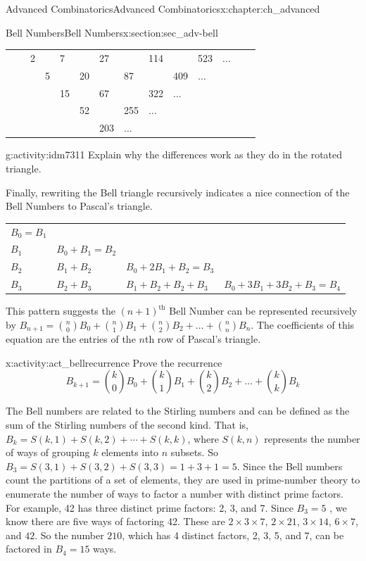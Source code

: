 \documentclass[oneside,10pt,]{book}
\numberwithin{equation}{chapter}
\begin{document}
\begin{chapterptx}{Advanced Combinatorics}{}{Advanced Combinatorics}{}{}{x:chapter:ch_advanced}
\begin{sectionptx}{Bell Numbers}{}{Bell Numbers}{}{}{x:section:sec_adv-bell}
\begin{sidebyside}{1}{0}{0}{0}
\begin{sbspanel}{1}
{\begin{tabular}{llllllllllllll}
&&2&&7&&27&&114&&523&\(\ldots\)&&\tabularnewline[0pt]
&&&5&&20&&87&&409&\(\ldots\)&&&\tabularnewline[0pt]
&&&&15&&67&&322&\(\ldots\)&&&&\tabularnewline[0pt]
&&&&&52&&255&\(\ldots\)&&&&&\tabularnewline[0pt]
&&&&&&203&\(\ldots\)&&&&&&
\end{tabular}
\par}
\end{sbspanel}%
\end{sidebyside}%
\begin{activity}{}{g:activity:idm7311}%
Explain why the differences work as they do in the rotated triangle.%
\end{activity}
Finally, rewriting the Bell triangle recursively indicates a nice connection of the Bell Numbers to Pascal's triangle.%
\begin{sidebyside}{1}{0}{0}{0}%
\begin{sbspanel}{1}%
{\centering%
\begin{tabular}{llll}
\(B_{0} = B_{1}\)&&&\tabularnewline[0pt]
\(B_{1}\)&\(B_{0} + B_{1} = B_{2}\)&&\tabularnewline[0pt]
\(B_{2}\)&\(B_{1} + B_{2}\)&\(B_{0} + 2B_{1} + B_{2} = B_{3}\)&\tabularnewline[0pt]
\(B_{3}\)&\(B_{2} + B_{3}\)&\(B_{1} + B_{2} + B_{2} + B_{3}\)&\(B_{0} + 3B_{1} + 3B_{2} + B_{3} = B_{4}\)
\end{tabular}
\par}
\end{sbspanel}%
\end{sidebyside}%
\par
This pattern suggests the \({(n + 1)}^{\text{th}}\) Bell Number can be represented recursively by \(B_{n + 1} = \binom{n}{0} B_{0} + \binom{n}{1} B_{1} + \binom{n}{2}B_{2} + \ldots + \binom{n}{n} B_{n}\). The coefficients of this equation are the entries of the \(n\)th row of Pascal's triangle.%
\begin{activity}{}{x:activity:act_bellrecurrence}%
Prove the recurrence%
\begin{equation*}
B_{k + 1} = \binom{k}{0} B_{0} + \binom{k}{1} B_{1} + \binom{k}{2}B_{2} + \ldots + \binom{k}{k} B_{k}
\end{equation*}
%
\end{activity}
The Bell numbers are related to the Stirling numbers and can be defined as the sum of the Stirling numbers of the second kind. That is, \(B_{k} = S(k,1) + S(k,2) + \cdots + S(k,k)\), where \(S(k,n)\) represents the number of ways of grouping \(k\) elements into \(n\) subsets. So \(B_{3} = S(3,1) + S(3,2) + S(3,3) = 1 + 3 + 1 = 5\). Since the Bell numbers count the partitions of a set of elements, they are used in prime-number theory to enumerate the number of ways to factor a number with distinct prime factors. For example, 42 has three distinct prime factors: 2, 3, and 7. Since \(B_{3} = 5\) , we know there are five ways of factoring 42. These are \(2 \times 3 \times 7\), \(2 \times 21\), \(3 \times 14\), \(6 \times 7\), and \(42\). So the number \(210\), which has 4 distinct factors, 2, 3, 5, and 7, can be factored in \(B_{4} = 15\) ways.%

\end{sectionptx}
\end{chapterptx}
\end{document}
